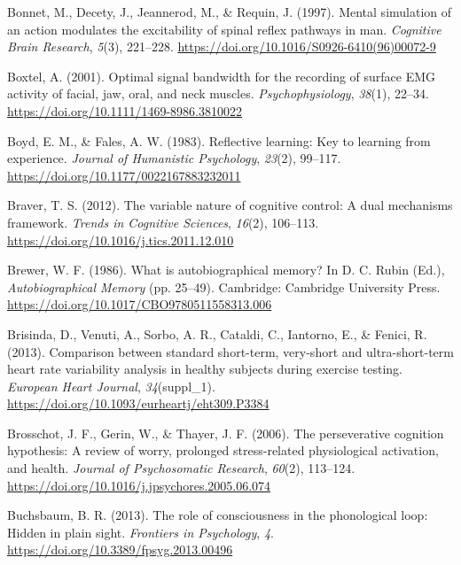 \documentclass[a4paper,12pt,twoside,onecolumn,openright,final,oldfontcommands]{memoir}
\begin{document}
\leavevmode\hypertarget{ref-bonnet_mental_1997}{}%
Bonnet, M., Decety, J., Jeannerod, M., \& Requin, J. (1997). Mental simulation of an action modulates the excitability of spinal reflex pathways in man. \emph{Cognitive Brain Research}, \emph{5}(3), 221--228. \url{https://doi.org/10.1016/S0926-6410(96)00072-9}

\leavevmode\hypertarget{ref-boxtel_optimal_2001}{}%
Boxtel, A. (2001). Optimal signal bandwidth for the recording of surface EMG activity of facial, jaw, oral, and neck muscles. \emph{Psychophysiology}, \emph{38}(1), 22--34. \url{https://doi.org/10.1111/1469-8986.3810022}

\leavevmode\hypertarget{ref-boyd_reflective_1983}{}%
Boyd, E. M., \& Fales, A. W. (1983). Reflective learning: Key to learning from experience. \emph{Journal of Humanistic Psychology}, \emph{23}(2), 99--117. \url{https://doi.org/10.1177/0022167883232011}

\leavevmode\hypertarget{ref-braver_variable_2012}{}%
Braver, T. S. (2012). The variable nature of cognitive control: A dual mechanisms framework. \emph{Trends in Cognitive Sciences}, \emph{16}(2), 106--113. \url{https://doi.org/10.1016/j.tics.2011.12.010}

\leavevmode\hypertarget{ref-rubin_what_1986}{}%
Brewer, W. F. (1986). What is autobiographical memory? In D. C. Rubin (Ed.), \emph{Autobiographical Memory} (pp. 25--49). Cambridge: Cambridge University Press. \url{https://doi.org/10.1017/CBO9780511558313.006}

\leavevmode\hypertarget{ref-brisinda_comparison_2013}{}%
Brisinda, D., Venuti, A., Sorbo, A. R., Cataldi, C., Iantorno, E., \& Fenici, R. (2013). Comparison between standard short-term, very-short and ultra-short-term heart rate variability analysis in healthy subjects during exercise testing. \emph{European Heart Journal}, \emph{34}(suppl\_1). \url{https://doi.org/10.1093/eurheartj/eht309.P3384}

\leavevmode\hypertarget{ref-Brosschot2006}{}%
Brosschot, J. F., Gerin, W., \& Thayer, J. F. (2006). The perseverative cognition hypothesis: A review of worry, prolonged stress-related physiological activation, and health. \emph{Journal of Psychosomatic Research}, \emph{60}(2), 113--124. \url{https://doi.org/10.1016/j.jpsychores.2005.06.074}

\leavevmode\hypertarget{ref-buchsbaum_role_2013}{}%
Buchsbaum, B. R. (2013). The role of consciousness in the phonological loop: Hidden in plain sight. \emph{Frontiers in Psychology}, \emph{4}. \url{https://doi.org/10.3389/fpsyg.2013.00496}
\end{document}
